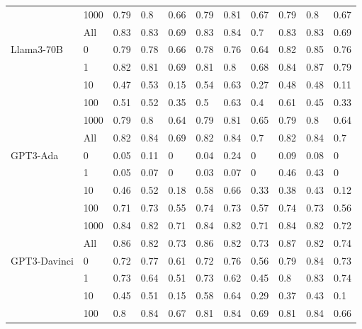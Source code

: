 \begin{table}
\begin{tabular}[t]{llll>{}l|ll>{}l|lll}
 & 1000 & 0.79 & 0.8 & 0.66 & 0.79 & 0.81 & 0.67 & 0.79 & 0.8 & 0.67\\

 & All & 0.83 & 0.83 & 0.69 & 0.83 & 0.84 & 0.7 & 0.83 & 0.83 & 0.69\\
\cmidrule{1-11}
Llama3-70B & 0 & 0.79 & 0.78 & 0.66 & 0.78 & 0.76 & 0.64 & 0.82 & 0.85 & 0.76\\

 & 1 & 0.82 & 0.81 & 0.69 & 0.81 & 0.8 & 0.68 & 0.84 & 0.87 & 0.79\\

 & 10 & 0.47 & 0.53 & 0.15 & 0.54 & 0.63 & 0.27 & 0.48 & 0.48 & 0.11\\

 & 100 & 0.51 & 0.52 & 0.35 & 0.5 & 0.63 & 0.4 & 0.61 & 0.45 & 0.33\\

 & 1000 & 0.79 & 0.8 & 0.64 & 0.79 & 0.81 & 0.65 & 0.79 & 0.8 & 0.64\\

 & All & 0.82 & 0.84 & 0.69 & 0.82 & 0.84 & 0.7 & 0.82 & 0.84 & 0.7\\
\cmidrule{1-11}
GPT3-Ada & 0 & 0.05 & 0.11 & 0 & 0.04 & 0.24 & 0 & 0.09 & 0.08 & 0\\

 & 1 & 0.05 & 0.07 & 0 & 0.03 & 0.07 & 0 & 0.46 & 0.43 & 0\\

 & 10 & 0.46 & 0.52 & 0.18 & 0.58 & 0.66 & 0.33 & 0.38 & 0.43 & 0.12\\

 & 100 & 0.71 & 0.73 & 0.55 & 0.74 & 0.73 & 0.57 & 0.74 & 0.73 & 0.56\\

 & 1000 & 0.84 & 0.82 & 0.71 & 0.84 & 0.82 & 0.71 & 0.84 & 0.82 & 0.72\\

 & All & 0.86 & 0.82 & 0.73 & 0.86 & 0.82 & 0.73 & 0.87 & 0.82 & 0.74\\
\cmidrule{1-11}
GPT3-Davinci & 0 & 0.72 & 0.77 & 0.61 & 0.72 & 0.76 & 0.56 & 0.79 & 0.84 & 0.73\\

 & 1 & 0.73 & 0.64 & 0.51 & 0.73 & 0.62 & 0.45 & 0.8 & 0.83 & 0.74\\

 & 10 & 0.45 & 0.51 & 0.15 & 0.58 & 0.64 & 0.29 & 0.37 & 0.43 & 0.1\\

 & 100 & 0.8 & 0.84 & 0.67 & 0.81 & 0.84 & 0.69 & 0.81 & 0.84 & 0.66\\


\end{tabular}
\end{table}
